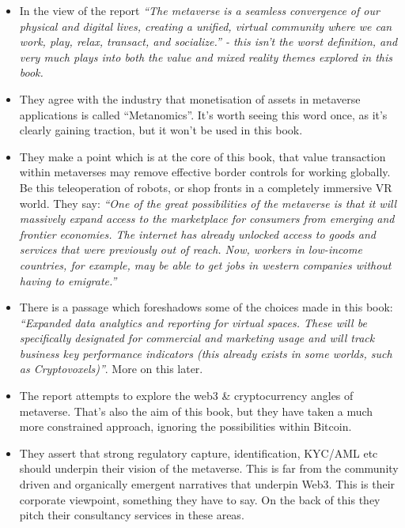 \begin{itemize}
\item In the view of the report \textit{``The metaverse is a seamless convergence of our physical and digital lives, creating a unified, virtual community where we can work, play, relax, transact, and socialize.'' - this isn't the worst definition, and very much plays into both the value and mixed reality themes explored in this book.}
\item They agree with the industry that monetisation of assets in metaverse applications is called ``Metanomics''. It's worth seeing this word once, as it's clearly gaining traction, but it won't be used in this book.
\item They make a point which is at the core of this book, that value transaction within metaverses may remove effective border controls for working globally. Be this teleoperation of robots, or shop fronts in a completely immersive VR world. They say: \textit{``One of the great possibilities of the metaverse is that it will massively expand access to the marketplace for consumers from emerging and frontier economies. The internet has already unlocked access to goods and services that were previously out of reach. Now, workers in low-income countries, for example, may be able to get jobs in western companies without having to emigrate.''}
\item There is a passage which foreshadows some of the choices made in this book: \textit{``Expanded data analytics and reporting for virtual spaces. These will be specifically designated for commercial and marketing usage and will track business key performance indicators (this
already exists in some worlds, such as Cryptovoxels)''}. More on this later.
\item The report attempts to explore the web3 \& cryptocurrency angles of metaverse. That's also the aim of this book, but they have taken a much more constrained approach, ignoring the possibilities within Bitcoin.
\item They assert that strong regulatory capture, identification, KYC/AML etc should underpin their vision of the metaverse. This is far from the community driven and organically emergent narratives that underpin Web3. This is their corporate viewpoint, something they have to say. On the back of this they pitch their consultancy services in these areas.
\end{itemize}
